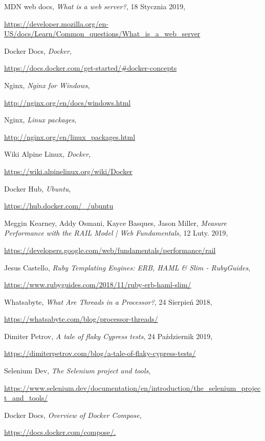 \begin{thebibliography}{99}
MDN web docs,
\emph{What is a web server?},
18 Stycznia 2019,

\url{https://developer.mozilla.org/en-US/docs/Learn/Common_questions/What_is_a_web_server}

Docker Docs,
\emph{Docker},

\url{https://docs.docker.com/get-started/#docker-concepts}

Nginx,
\emph{Nginx for Windows},

\url{http://nginx.org/en/docs/windows.html}

Nginx, 
\emph{Linux packages},

\url{http://nginx.org/en/linux_packages.html}

Wiki Alpine Linux, 
\emph{Docker},

\url{https://wiki.alpinelinux.org/wiki/Docker}

Docker Hub,
\emph{Ubuntu},

\url{https://hub.docker.com/_/ubuntu}

Meggin Kearney, Addy Osmani, Kayce Basques, Jason Miller,
\emph{Measure Performance with the RAIL Model | Web Fundamentals},
12 Luty. 2019,

\url{https://developers.google.com/web/fundamentals/performance/rail}

Jesus Castello, 
\emph{Ruby Templating Engines: ERB, HAML \& Slim - RubyGuides},

\url{https://www.rubyguides.com/2018/11/ruby-erb-haml-slim/}

Whatsabyte,
\emph{What Are Threads in a Processor?},
24 Sierpień 2018,

\url{https://whatsabyte.com/blog/processor-threads/}

Dimiter Petrov,
\emph{A tale of flaky Cypress tests},
24 Październik 2019,

\url{https://dimiterpetrov.com/blog/a-tale-of-flaky-cypress-tests/}

Selenium Dev,
\emph{The Selenium project and tools},

\url{https://www.selenium.dev/documentation/en/introduction/the_selenium_project_and_tools/}

Docker Docs,
\emph{Overview of Docker Compose},

\url{https://docs.docker.com/compose/.}


\end{thebibliography}
